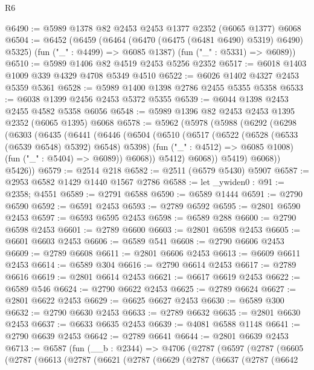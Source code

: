 \begin{lexlean}{R6}
\begin{coremodule}
@6490 := @5989 @1378 @82 @2453 @2453 @1377 @2352 (@6065 @1377) @6068
@6504 := @6452
    (@6459
      (@6464 (@6470 (@6475 (@6481 @6490) @5319) @6490) @5325)
      (fun ("_" : @4499) => @6085 @1387)
      (fun ("_" : @5331) => @6089))
@6510 := @5989 @1406 @82 @4519 @2453 @5256 @2352
@6517 := @6018 @1403 @1009 @339 @4329 @4708 @5349 @4510
@6522 := @6026 @1402 @4327 @2453 @5359 @5361
@6528 := @5989 @1400 @1398 @2786 @2455 @5355 @5358
@6533 := @6038 @1399 @2456 @2453 @5372 @5355
@6539 := @6044 @1398 @2453 @2455 @4582 @5358 @6056
@6548 := @5989 @1396 @82 @2453 @2453 @1395 @2352 (@6065 @1395) @6068
@6578 := @5962
    (@5978
      (@5988
        (@6292
          (@6298
            (@6303
              (@6435
                (@6441
                  (@6446
                    (@6504
                      (@6510
                        (@6517
                          (@6522 (@6528 (@6533 (@6539 @6548) @5392) @6548) @5398)
                          (fun ("_" : @4512) => @6085 @1008)
                          (fun ("_" : @5404) => @6089))
                        @6068))
                    @5412)
                  @6068))
              @5419)
            @6068))
        @5426))
@6579 := @2514 @218
@6582 := @2511 (@6579 @5430) @5907
@6587 := @2953 @6582 @1429 @1440 @1567 @2786
@6588 := let _ywiden0 : @91 := @2358; @4551
@6589 := @2791 @6588
@6590 := @6589 @1444
@6591 := @2790 @6590
@6592 := @6591 @2453
@6593 := @2789 @6592
@6595 := @2801 @6590 @2453
@6597 := @6593 @6595 @2453
@6598 := @6589 @288
@6600 := @2790 @6598 @2453
@6601 := @2789 @6600
@6603 := @2801 @6598 @2453
@6605 := @6601 @6603 @2453
@6606 := @6589 @541
@6608 := @2790 @6606 @2453
@6609 := @2789 @6608
@6611 := @2801 @6606 @2453
@6613 := @6609 @6611 @2453
@6614 := @6589 @304
@6616 := @2790 @6614 @2453
@6617 := @2789 @6616
@6619 := @2801 @6614 @2453
@6621 := @6617 @6619 @2453
@6622 := @6589 @546
@6624 := @2790 @6622 @2453
@6625 := @2789 @6624
@6627 := @2801 @6622 @2453
@6629 := @6625 @6627 @2453
@6630 := @6589 @300
@6632 := @2790 @6630 @2453
@6633 := @2789 @6632
@6635 := @2801 @6630 @2453
@6637 := @6633 @6635 @2453
@6639 := @4081 @6588 @1148
@6641 := @2790 @6639 @2453
@6642 := @2789 @6641
@6644 := @2801 @6639 @2453
@6713 := @6587
    (fun (__b : @2344) =>
    @4706
      (@2787
        (@6597
          (@2787
            (@6605
              (@2787
                (@6613
                  (@2787
                    (@6621
                      (@2787
                        (@6629
                          (@2787
                            (@6637
                              (@2787
                                (@6642

\end{coremodule}
\end{lexlean}
